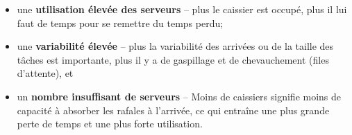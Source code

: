 \begin{itemize}
\item une \textbf{utilisation élevée des serveurs} -- plus le caissier est occupé, plus il lui faut de temps pour se remettre du temps perdu; 
\item une \textbf{variabilité élevée} -- plus la variabilité des arrivées ou de la taille des tâches est importante, plus il y a de gaspillage et de chevauchement (files d'attente), et 
\item un \textbf{nombre insuffisant de serveurs} -- Moins de caissiers signifie moins de capacité à absorber les rafales à l'arrivée, ce qui entraîne une plus grande perte de temps et une plus forte utilisation.
\end{itemize}